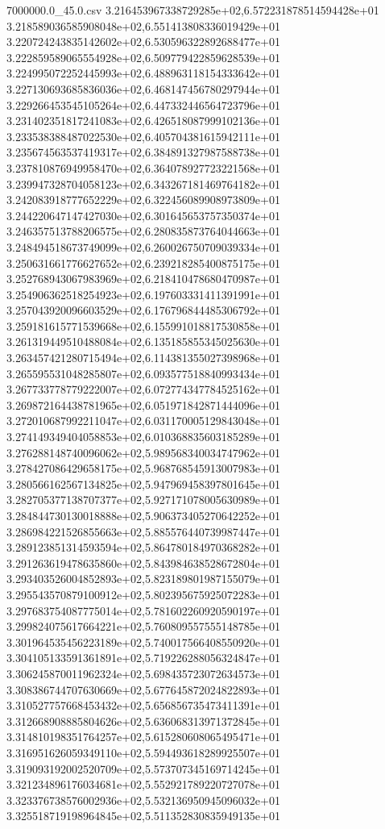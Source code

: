 \begin{filecontents*}{7000000.0_45.0.csv}
3.216453967338729285e+02,6.572231878514594428e+01
3.218589036585908048e+02,6.551413808336019429e+01
3.220724243835142602e+02,6.530596322892688477e+01
3.222859589065554928e+02,6.509779422859628539e+01
3.224995072252445993e+02,6.488963118154333642e+01
3.227130693685836036e+02,6.468147456780297944e+01
3.229266453545105264e+02,6.447332446564723796e+01
3.231402351817241083e+02,6.426518087999102136e+01
3.233538388487022530e+02,6.405704381615942111e+01
3.235674563537419317e+02,6.384891327987588738e+01
3.237810876949958470e+02,6.364078927723221568e+01
3.239947328704058123e+02,6.343267181469764182e+01
3.242083918777652229e+02,6.322456089908973809e+01
3.244220647147427030e+02,6.301645653757350374e+01
3.246357513788206575e+02,6.280835873764044663e+01
3.248494518673749099e+02,6.260026750709039334e+01
3.250631661776627652e+02,6.239218285400875175e+01
3.252768943067983969e+02,6.218410478680470987e+01
3.254906362518254923e+02,6.197603331411391991e+01
3.257043920096603529e+02,6.176796844485306792e+01
3.259181615771539668e+02,6.155991018817530858e+01
3.261319449510488084e+02,6.135185855345025630e+01
3.263457421280715494e+02,6.114381355027398968e+01
3.265595531048285807e+02,6.093577518840993434e+01
3.267733778779222007e+02,6.072774347784525162e+01
3.269872164438781965e+02,6.051971842871444096e+01
3.272010687992211047e+02,6.031170005129843048e+01
3.274149349404058853e+02,6.010368835603185289e+01
3.276288148740096062e+02,5.989568340034747962e+01
3.278427086429658175e+02,5.968768545913007983e+01
3.280566162567134825e+02,5.947969458397801645e+01
3.282705377138707377e+02,5.927171078005630989e+01
3.284844730130018888e+02,5.906373405270642252e+01
3.286984221526855663e+02,5.885576440739987447e+01
3.289123851314593594e+02,5.864780184970368282e+01
3.291263619478635860e+02,5.843984638528672804e+01
3.293403526004852893e+02,5.823189801987155079e+01
3.295543570879100912e+02,5.802395675925072283e+01
3.297683754087775014e+02,5.781602260920590197e+01
3.299824075617664221e+02,5.760809557555148785e+01
3.301964535456223189e+02,5.740017566408550920e+01
3.304105133591361891e+02,5.719226288056324847e+01
3.306245870011962324e+02,5.698435723072634573e+01
3.308386744707630669e+02,5.677645872024822893e+01
3.310527757668453432e+02,5.656856735473411391e+01
3.312668908885804626e+02,5.636068313971372845e+01
3.314810198351764257e+02,5.615280608065495471e+01
3.316951626059349110e+02,5.594493618289925507e+01
3.319093192002520709e+02,5.573707345169714245e+01
3.321234896176034681e+02,5.552921789220727078e+01
3.323376738576002936e+02,5.532136950945096032e+01
3.325518719198964845e+02,5.511352830835949135e+01

\end{filecontents*}
